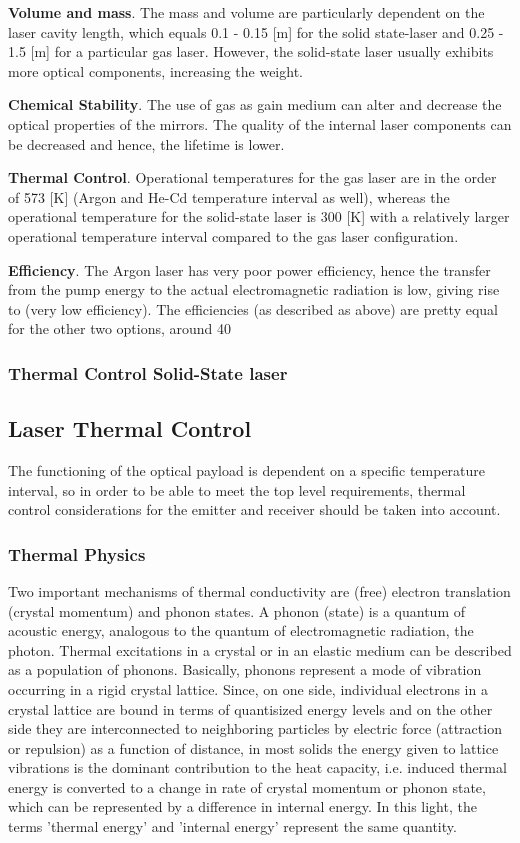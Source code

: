 \textbf{Volume and mass}. 
The mass and volume are particularly dependent on the \acs{laser} cavity length, which equals 0.1 - 0.15 [m] for the solid state-laser and 0.25 - 1.5 [m] for a particular gas \acs{laser}. However, the solid-state \acs{laser} usually exhibits more optical components, increasing the weight.  

\textbf{Chemical Stability}. The use of gas as gain medium can alter and decrease the optical properties of the mirrors. The quality of the internal \acs{laser} components can be decreased and hence, the lifetime is lower.   

\textbf{Thermal Control}. Operational temperatures for the gas \acs{laser} are in the order of 573 [K] (Argon and He-Cd temperature interval as well), whereas the operational temperature for the solid-state \acs{laser} is 300 [K] with a relatively larger operational temperature interval compared to the gas \acs{laser} configuration.  

\textbf{Efficiency}. The Argon \acs{laser} has very poor power efficiency, hence the transfer from the pump energy to the actual electromagnetic radiation is low, giving rise to (very low efficiency). The efficiencies (as described as above) are pretty equal for the other two options, around 40%
 
	
	\subsubsection{Thermal Control Solid-State \acs{laser}}
\subsection{Laser Thermal Control}
	\label{mtLSRthermal}
The functioning of the optical payload is dependent on a specific temperature interval, so in order to be able to meet the top level requirements, thermal control considerations for the emitter and receiver should be taken into account. 

\subsubsection{Thermal Physics}
	\label{mtLSRthermalphysics}
Two important mechanisms of thermal conductivity are (free) electron translation (crystal momentum) and phonon states. A phonon (state) is a quantum of acoustic energy, analogous to the quantum of electromagnetic radiation, the photon. Thermal excitations in a crystal or in an elastic medium can be described as a population of phonons. Basically, phonons represent a mode of vibration occurring in a rigid crystal lattice. Since, on one side, individual electrons in a crystal lattice are bound in terms of quantisized energy levels and on the other side they are interconnected to neighboring particles by electric force (attraction or repulsion) as a function of distance, in most solids the energy given to lattice vibrations is the dominant contribution to the heat capacity, i.e. induced thermal energy is converted to a change in rate of crystal momentum or phonon state, which can be represented by a difference in internal energy. In this light, the terms 'thermal energy' and 'internal energy' represent the same quantity. 

